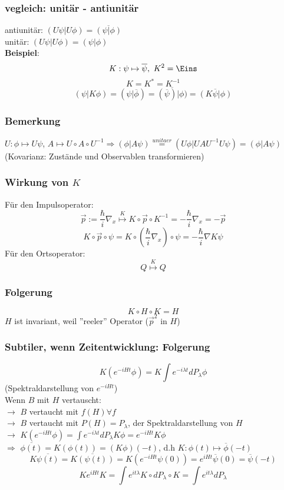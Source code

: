 \documentclass[twoside,a4paper]{scrartcl}
\renewcommand{\1}{\mathds{1}}
\newcommand{\Ra}{\Rightarrow}
\newcommand{\ra}{\rightarrow}
\renewcommand{\l}{\lambda}
\begin{document}
\subsubsection*{vegleich: unitär - antiunitär}
antiunitär: $(U\psi|U\phi)=\overline{(\psi|\phi)}$\\
unitär: $(U\psi|U\phi)=(\psi|\phi)$\\

\textbf{Beispiel}:\\
$$K: \psi \mapsto \overline{\psi}, \ K^2=\Eins$$
$$K=K^*=K^{-1}$$
$$(\psi|K\phi)=(\psi|\overline{\phi})=\overline{(\overline{\psi})|\phi)}=\overline{(K\psi|\phi)}$$
\subsubsection*{Bemerkung}
$U: \phi \mapsto U\psi$, $A \mapsto U \circ A \circ U^{-1} \Ra (\phi|A\psi)\stackrel{unitaer}{=}(U\phi|UAU^{-1}U\psi)=(\phi|A\psi)$\\
(Kovarianz: Zustände und Observablen transformieren)
\subsubsection*{Wirkung von $K$}
Für den Impulsoperator:
$$\vec p:= \frac{\hbar}{i}\nabla_x \stackrel{K}{\mapsto} K \circ \vec p \circ K^{-1}=-\frac{\hbar}{i} \nabla_x=-\vec p$$
$$K\circ \vec p \circ \psi= K \circ (\frac{\hbar}{i} \nabla_x )\circ \psi =-\frac{\hbar}{i} \nabla K \psi $$
Für den Ortsoperator:
$$Q \stackrel{K}{\mapsto}  Q$$
\subsubsection*{Folgerung}
$$K \circ H \circ K = H$$
$H$ ist invariant, weil ''reeler'' Operator ($\vec p^2$ in $H$)
\subsubsection*{Subtiler, wenn Zeitentwicklung: Folgerung}
$$K(e^{-iHt}\phi)=K\int e^{-i\l t} dP_\l \phi$$
(Spektraldarstellung von $e^{-iHt}$)\\
Wenn $B$ mit $H$ vertauscht:\\
$\ra$ $B$ vertaucht mit $f(H) \forall f$\\
$\ra$ $B$ vertaucht mit $P(H)=P_\lambda$, der Spektraldarstellung von $H$\\
$\ra$ $K(e^{-iHt}\phi)=\int e^{-i\l t} dP_\l K\phi=e^{-iHt}K\phi$\\
$\Ra$ $\overline{\phi(t)}=K(\phi(t))=(K\phi)(-t)$, d.h $K: \phi(t) \mapsto \overline{\phi}(-t)$
$$K\overline{\psi(t)}=\overline{K(\psi(t))}=K(e^{-iHt}\psi(0))=e^{iHt}\overline{\psi}(0)=\overline{\psi}(-t)$$
$$Ke^{iHt}K=\int e^{it\lambda} K \circ dP_\lambda \circ K =\int e^{it\lambda} dP_\lambda$$
\end{document}
